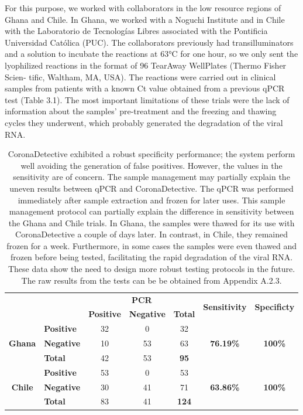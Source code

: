 For this purpose, we worked with collaborators in the low resource regions of Ghana and Chile. In Ghana, we worked with a Noguchi Institute and in Chile with the Laboratorio de Tecnologías Libres associated with the Pontificia Universidad Católica (PUC). The collaborators previously had transilluminators and a solution to incubate the reactions at 63°C for one hour, so we only sent the lyophilized reactions in the format of 96 TearAway WellPlates (Thermo Fisher Scien-
tific, Waltham, MA, USA). The reactions were carried out in clinical samples from patients with a known Ct value obtained from a previous qPCR test (Table 3.1). The most important limitations of these trials were the lack of information about the samples' pre-treatment and the freezing and thawing cycles they underwent, which probably generated the degradation of the viral RNA. 
\vspace{12pt}
\begin{table}[]
\begin{center}
\begin{tabular}{clccccc}
\multicolumn{1}{l}{\multirow{2}{*}{}} & \multirow{2}{*}{} & \multicolumn{3}{c}{\textbf{PCR}} & \multirow{2}{*}{\textbf{Sensitivity}} & \multirow{2}{*}{\textbf{Specificty}} \\
\multicolumn{1}{l}{} &  & \textbf{Positive} & \textbf{Negative} & \textbf{Total} &  &  \\
\hline
\multirow{3}{*}{\textbf{Ghana}} & \textbf{Positive} & 32 & 0 & 32 & \multirow{3}{*}{\textbf{76.19\%}} & \multirow{3}{*}{\textbf{100\%}} \\
 & \textbf{Negative} & 10 & 53 & 63 &  &  \\
 & \textbf{Total} & 42 & 53 & \textbf{95} &  &  \\
 \hline
\multirow{3}{*}{\textbf{Chile}} & \textbf{Positive} & 53 & 0 & 53 & \multirow{3}{*}{\textbf{63.86\%}} & \multirow{3}{*}{\textbf{100\%}} \\
 & \textbf{Negative} & 30 & 41 & 71 &  &  \\
 & \textbf{Total} & 83 & 41 & \textbf{124} &  & 
\end{tabular}
\end{center}
\vspace{10pt}
\caption{CoronaDetective exhibited a robust specificity performance; the system perform well avoiding the generation of false positives. However, the values in the sensitivity are of concern. The sample management may partially explain the uneven results between qPCR and CoronaDetective. The qPCR was performed immediately after sample extraction and frozen for later uses. This sample management protocol can partially explain the difference in sensitivity between the Ghana and Chile trials. In Ghana, the samples were thawed for its use with CoronaDetective a couple of days later. In contrast, in Chile, they remained frozen for a week. Furthermore, in some cases the samples were even thawed and frozen before being tested, facilitating the rapid degradation of the viral RNA. These data show the need to design more robust testing protocols in the future. The raw results from the tests can be be obtained from Appendix A.2.3.}
\end{table}

